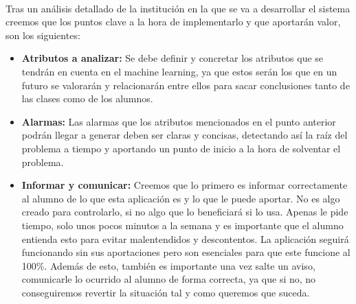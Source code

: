 \paragraph{}
Tras un análisis detallado de la institución en la que se va a
desarrollar el sistema creemos que los puntos clave a la hora de
implementarlo y que aportarán valor, son los siguientes:

\begin{itemize}
\item \textbf{Atributos a analizar:} Se debe definir y concretar los
  atributos que se tendrán en cuenta en el machine learning, ya que
  estos serán los que en un futuro se valorarán y relacionarán entre
  ellos para sacar conclusiones tanto de las clases como de los
  alumnos.

\item \textbf{Alarmas:} Las alarmas que los atributos mencionados en
  el punto anterior podrán llegar a generar deben ser claras y
  concisas, detectando así la raíz del problema a tiempo y aportando
  un punto de inicio a la hora de solventar el problema.

\item \textbf{Informar y comunicar:} Creemos que lo primero es
  informar correctamente al alumno de lo que esta aplicación es y lo
  que le puede aportar. No es algo creado para controlarlo, si no algo
  que lo beneficiará si lo usa. Apenas le pide tiempo, solo unos pocos
  minutos a la semana y es importante que el alumno entienda esto para
  evitar malentendidos y descontentos. La aplicación seguirá
  funcionando sin sus aportaciones pero son esenciales para que este
  funcione al 100\%. Además de esto, también es importante una vez
  salte un aviso, comunicarle lo ocurrido al alumno de forma correcta,
  ya que si no, no conseguiremos revertir la situación tal y como
  queremos que suceda.

\nocite{marcoPedagogico}\nocite{hezkuntzaEreduArdatzak}\nocite{metodologiaParticipativa}\nocite{aprendizajeBasadoEnProblemas}\nocite{profesorUniversitario}\nocite{modeloUniversitario}

\end{itemize}
